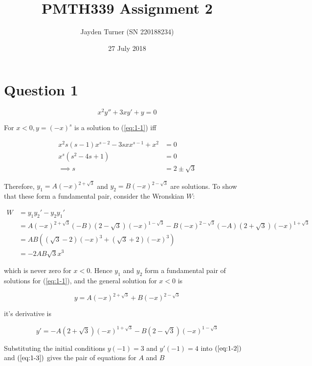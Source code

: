 \documentclass{article}
\title{PMTH339 Assignment 2}
\date{27 July 2018}
\author{Jayden Turner (SN 220188234)}
\begin{document}
\maketitle
{}

\section*{Question 1}

\begin{equation} \label{eq:1-1}
    x^2y'' + 3xy' + y = 0
\end{equation}

For $x < 0, y = (-x)^s$ is a solution to (\ref{eq:1-1}) iff

\begin{align*}
    x^2s(s - 1)x^{s - 2} - 3sxx^{s - 1} + x^2 &= 0\\
    x^s(s^2 - 4s + 1) &= 0\\
    \implies s &= 2 \pm \sqrt{3}
\end{align*}

Therefore, $y_1 = A(-x)^{2 + \sqrt{3}}$ and $y_2 = B(-x)^{2 - \sqrt{3}}$ are solutions. To show that these form a fundamental pair, consider the
Wronskian $W$:

\begin{align*}
    W &= y_1y_2' - y_2y_1'\\
    &= A(-x)^{2 + \sqrt{3}}(-B)(2 - \sqrt{3})(-x)^{1 - \sqrt{3}} - B(-x)^{2 - \sqrt{3}}(-A)(2 + \sqrt{3})(-x)^{1 + \sqrt{3}}\\
    &= AB((\sqrt{3} - 2)(-x)^3 + (\sqrt{3} + 2)(-x)^3)\\
    &= -2AB\sqrt{3}x^3
\end{align*}

which is never zero for $x < 0$. Hence $y_1$ and $y_2$ form a fundamental pair of solutions for (\ref{eq:1-1}), and the general solution for $x < 0$ is

\begin{equation} \label{eq:1-2}
    y = A(-x)^{2 + \sqrt{3}} + B(-x)^{2 - \sqrt{3}}
\end{equation}

it's derivative is

\begin{equation} \label{eq:1-3}
    y' = -A(2 + \sqrt{3})(-x)^{1 + \sqrt{3}} - B(2 - \sqrt{3})(-x)^{1 - \sqrt{3}}
\end{equation}

Substituting the initial conditions $y(-1) = 3$ and $y'(-1) = 4$ into $(\ref{eq:1-2})$ and $(\ref{eq:1-3})$ gives the pair of equations for $A$ and $B$
\end{document}
